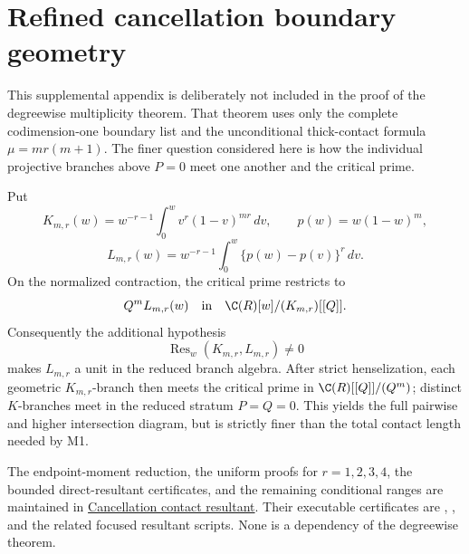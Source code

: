 \section{Refined cancellation boundary geometry}

This supplemental appendix is deliberately not included in the proof of the
degreewise multiplicity theorem.  That theorem uses only the complete
codimension-one boundary list and the unconditional thick-contact formula
$\mu=mr(m+1)$.  The finer question considered here is how the individual
projective branches above $P=0$ meet one another and the critical prime.

Put
\[
 K_{m,r}(w)=w^{-r-1}\int_0^w v^r(1-v)^{mr}\,dv,
 \qquad p(w)=w(1-w)^m,
\]
\[
 L_{m,r}(w)=w^{-r-1}\int_0^w\{p(w)-p(v)\}^r\,dv.
\]
On the normalized contraction, the critical prime restricts to
\[
 Q^mL_{m,r}(w)
 \quad\text{in}\quad
 \C(R)[w]/(K_{m,r})[[Q]].
\]
Consequently the additional hypothesis
\[
 \operatorname{Res}_w(K_{m,r},L_{m,r})\ne0
\]
makes $L_{m,r}$ a unit in the reduced branch algebra.  After strict
henselization, each geometric $K_{m,r}$-branch then meets the critical prime
in $\C(R)[[Q]]/(Q^m)$; distinct $K$-branches meet in the reduced stratum
$P=Q=0$.  This yields the full pairwise and higher intersection diagram, but
is strictly finer than the total contact length needed by M1.

The endpoint-moment reduction, the uniform proofs for $r=1,2,3,4$, the
bounded direct-resultant certificates, and the remaining conditional ranges
are maintained in
\href{../../cancellation/CONTACT_RESULTANT.md}{Cancellation contact
resultant}.  Their executable certificates are
,
, and the related focused
resultant scripts.  None is a dependency of the degreewise theorem.
